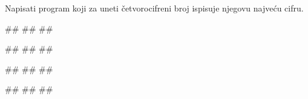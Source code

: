 \begin{Exercise}[label=p1.2_01] 
Napisati program koji za uneti četvorocifreni broj ispisuje njegovu najveću cifru. 

\begin{miditest}
\begin{upotreba}{1}
#\naslovInt#
##
##
\end{upotreba}
\end{miditest}
\begin{miditest}
\begin{upotreba}{2}
#\naslovInt#
##
##
\end{upotreba}
\end{miditest}

\begin{miditest}
\begin{upotreba}{3}
#\naslovInt#
##
##
\end{upotreba}
\end{miditest}
\begin{miditest}
\begin{upotreba}{4}
#\naslovInt#
##
##
\end{upotreba}
\end{miditest}

\end{Exercise}
\begin{Answer}[ref=p1.2_01]
\end{Answer}

